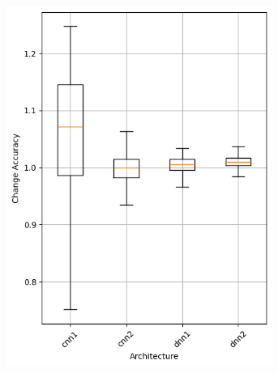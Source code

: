 \begin{figure}
    \begin{subfigure}{0.5\textwidth}
        \centering
        \includegraphics[width=0.95\textwidth]{plots/Architecture_Trained_accuracy.png}
    \end{subfigure}
    \begin{subfigure}{0.5\textwidth}
        \centering

\end{subfigure}
\end{figure}
